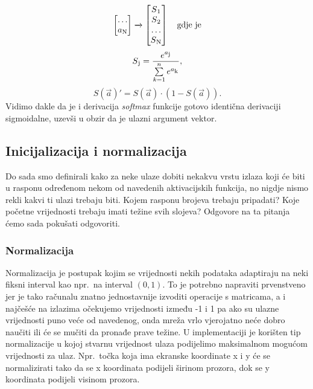 \documentclass[times, utf8, zavrsni]{fer}
\begin{document}
\begin{enumerate}
\[\begin{bmatrix}
            \dots \\
            a\textsubscript{N}
        \end{bmatrix}
        \xrightarrow{}
        \begin{bmatrix}
            S\textsubscript{1} \\
            S\textsubscript{2} \\
            \dots \\
            S\textsubscript{N}
        \end{bmatrix} \quad \text{gdje je}
    \]
    \begin{equation}
        \label{eq:soft}
        S\textsubscript{j} = \frac{e^{a\textsubscript{j}}}{\sum\limits_{k=1}^ne^{a\textsubscript{k}}},
    \end{equation}
    \begin{equation}
        \label{eq:soft-der}
        S(\vec{a})' = S(\vec{a}) \cdot (1 - S(\vec{a})).
    \end{equation}
    Vidimo dakle da je i derivacija \textit{softmax} funkcije gotovo identična derivaciji sigmoidalne, uzevši u obzir da je ulazni argument vektor.
\end{enumerate}

\subsection{Inicijalizacija i normalizacija}
Do sada smo definirali kako za neke ulaze dobiti nekakvu vrstu izlaza koji će biti u rasponu određenom nekom od navedenih aktivacijskih funkcija, no nigdje nismo rekli kakvi ti ulazi trebaju biti. Kojem rasponu brojeva trebaju pripadati? Koje početne vrijednosti trebaju imati težine svih slojeva? Odgovore na ta pitanja ćemo sada pokušati odgovoriti.

\subsubsection{Normalizacija}
Normalizacija  je postupak kojim se vrijednosti nekih podataka adaptiraju na neki fiksni interval kao npr.\ na interval $(0, 1)$. To je potrebno napraviti prvenstveno jer je tako računalu znatno jednostavnije izvoditi operacije s matricama, a i najčešće na izlazima očekujemo vrijednosti između -1 i 1 pa ako su ulazne vrijednosti puno veće od navedenog, onda mreža vrlo vjerojatno neće dobro naučiti ili će se mučiti da pronađe prave težine. U implementaciji je korišten tip normalizacije u kojoj stvarnu vrijednost ulaza podijelimo maksimalnom mogućom vrijednosti za ulaz. Npr.\ točka koja ima ekranske koordinate x i y će se normalizirati tako da se x koordinata podijeli širinom prozora, dok se y koordinata podijeli visinom prozora.
\end{document}
